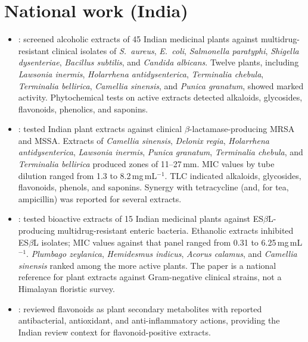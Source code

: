 \section{National work (India)}
\label{sec:lit_national}

\begin{itemize}

\item \citet{ahmadbeg2001}: screened alcoholic extracts of 45 Indian medicinal plants against multidrug-resistant clinical isolates of \textit{S.\ aureus}, \textit{E.\ coli}, \textit{Salmonella paratyphi}, \textit{Shigella dysenteriae}, \textit{Bacillus subtilis}, and \textit{Candida albicans}. Twelve plants, including \textit{Lawsonia inermis}, \textit{Holarrhena antidysenterica}, \textit{Terminalia chebula}, \textit{Terminalia bellirica}, \textit{Camellia sinensis}, and \textit{Punica granatum}, showed marked activity. Phytochemical tests on active extracts detected alkaloids, glycosides, flavonoids, phenolics, and saponins.

\item \citet{aqil2005}: tested Indian plant extracts against clinical $\beta$-lactamase-producing MRSA and MSSA. Extracts of \textit{Camellia sinensis}, \textit{Delonix regia}, \textit{Holarrhena antidysenterica}, \textit{Lawsonia inermis}, \textit{Punica granatum}, \textit{Terminalia chebula}, and \textit{Terminalia bellirica} produced zones of 11--27\,mm. MIC values by tube dilution ranged from 1.3 to 8.2\,mg\,mL$^{-1}$. TLC indicated alkaloids, glycosides, flavonoids, phenols, and saponins. Synergy with tetracycline (and, for tea, ampicillin) was reported for several extracts.

\item \citet{ahmadaqil2007}: tested bioactive extracts of 15 Indian medicinal plants against ES$\beta$L-producing multidrug-resistant enteric bacteria. Ethanolic extracts inhibited ES$\beta$L isolates; MIC values against that panel ranged from 0.31 to 6.25\,mg\,mL$^{-1}$. \textit{Plumbago zeylanica}, \textit{Hemidesmus indicus}, \textit{Acorus calamus}, and \textit{Camellia sinensis} ranked among the more active plants. The paper is a national reference for plant extracts against Gram-negative clinical strains, not a Himalayan floristic survey.

\item \citet{kumar2013}: reviewed flavonoids as plant secondary metabolites with reported antibacterial, antioxidant, and anti-inflammatory actions, providing the Indian review context for flavonoid-positive extracts.


\end{itemize}
